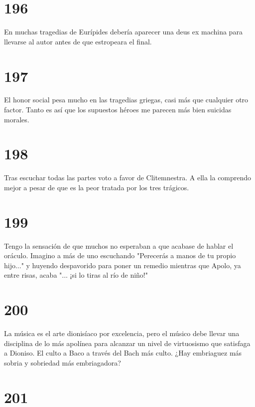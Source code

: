 \documentclass[a4paper,11pt,openright,twocolumn]{book}
\begin{document}
\section*{196}

En muchas tragedias de Eurípides debería aparecer una deus ex machina para
llevarse al autor antes de que estropeara el final. 

\section*{197}

El honor social pesa mucho en las tragedias griegas, casi más que cualquier otro factor. 
Tanto es así que los supuestos héroes me parecen más bien suicidas morales. 

\section*{198}

Tras escuchar todas las partes voto a favor de Clitemnestra. A ella la comprendo
mejor a pesar de que es la peor tratada por los tres trágicos.

\section*{199}

Tengo la sensación de que muchos no esperaban a que acabase de hablar el oráculo. 
Imagino a más de uno escuchando "Perecerás a manos de tu propio hijo..." y huyendo
despavorido para poner un remedio mientras que Apolo, ya entre risas, acaba 
"... ¡si lo tiras al río de niño!"

\section*{200}

La música es el arte dionisíaco por excelencia, pero el músico 
debe llevar una disciplina de lo más apolínea para alcanzar un
nivel de virtuosismo que satisfaga a Dioniso.
El culto a Baco a través del Bach más culto. ¿Hay embriaguez más sobria 
y sobriedad más embriagadora?

\section*{201}
\end{document}
